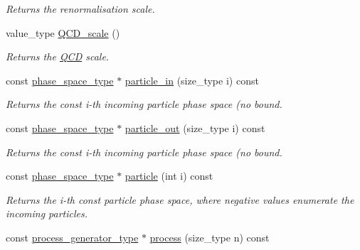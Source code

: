 \begin{DoxyCompactItemize}
\begin{DoxyCompactList}\small\item\em Returns the renormalisation scale. \end{DoxyCompactList}\item 
\hypertarget{a00210_a6ad3a46d7ebd0b31999c367c406bdb74}{value\-\_\-type \hyperlink{a00210_a6ad3a46d7ebd0b31999c367c406bdb74}{Q\-C\-D\-\_\-scale} ()}\label{a00210_a6ad3a46d7ebd0b31999c367c406bdb74}

\begin{DoxyCompactList}\small\item\em Returns the \hyperlink{a00449}{Q\-C\-D} scale. \end{DoxyCompactList}\item 
\hypertarget{a00210_a2a6c913c456f562a3e464cd89553993f}{const \hyperlink{a00400}{phase\-\_\-space\-\_\-type} $\ast$ \hyperlink{a00210_a2a6c913c456f562a3e464cd89553993f}{particle\-\_\-in} (size\-\_\-type i) const }\label{a00210_a2a6c913c456f562a3e464cd89553993f}

\begin{DoxyCompactList}\small\item\em Returns the const i-\/th incoming particle phase space (no bound. \end{DoxyCompactList}\item 
\hypertarget{a00210_af775cf485839e207d09aa4fcfefac37b}{const \hyperlink{a00400}{phase\-\_\-space\-\_\-type} $\ast$ \hyperlink{a00210_af775cf485839e207d09aa4fcfefac37b}{particle\-\_\-out} (size\-\_\-type i) const }\label{a00210_af775cf485839e207d09aa4fcfefac37b}

\begin{DoxyCompactList}\small\item\em Returns the const i-\/th incoming particle phase space (no bound. \end{DoxyCompactList}\item 
const \hyperlink{a00400}{phase\-\_\-space\-\_\-type} $\ast$ \hyperlink{a00210_aad5633c6865f0dfed332a7ca31f36621}{particle} (int i) const 
\begin{DoxyCompactList}\small\item\em Returns the i-\/th const particle phase space, where negative values enumerate the incoming particles. \end{DoxyCompactList}\item 
\hypertarget{a00210_a32760ad5ec0d357e0086617c77e99566}{const \hyperlink{a00430}{process\-\_\-generator\-\_\-type} $\ast$ \hyperlink{a00210_a32760ad5ec0d357e0086617c77e99566}{process} (size\-\_\-type n) const }\label{a00210_a32760ad5ec0d357e0086617c77e99566}


\end{DoxyCompactItemize}
